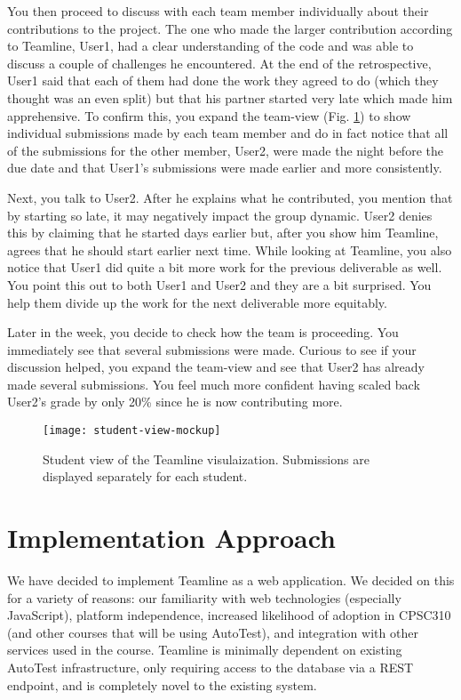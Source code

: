 \documentclass[preprint,journal]{vgtc}       %
\begin{document}
You then proceed to discuss with each team member individually about their contributions
to the project. The one who made the larger contribution according to Teamline, User1,
had a clear understanding of the code and was able to discuss a couple of challenges
he encountered. At the end of the retrospective, User1 said that each of them had
done the work they agreed to do (which they thought was an even split) but that
his partner started very late which made him apprehensive.
To confirm this, you expand the team-view (Fig. \ref{fig:studentview}) to show individual submissions made by
each team member and do in fact notice that all of the submissions for the other
member, User2, were made the night before the due date and that User1's submissions were
made earlier and more consistently.

Next, you talk to User2. After he explains what he contributed, you mention that by
starting so late, it may negatively impact the group dynamic. User2 denies this by claiming
that he started days earlier but, after you show him Teamline, agrees that he should
start earlier next time. While looking at Teamline, you also notice that User1 did
quite a bit more work for the previous deliverable as well. You point this out to
both User1 and User2 and they are a bit surprised. You help them divide up the work
for the next deliverable more equitably.

Later in the week, you decide to check how the team is proceeding. You immediately
see that several submissions were made. Curious to see if your discussion helped,
you expand the team-view and see that User2 has already made several submissions.
You feel much more confident having scaled back User2's grade by only 20\% since he
is now contributing more.

\begin{figure}[h]
  \centering
  \texttt{[image: student-view-mockup]}
  \caption{Student view of the Teamline visulaization. Submissions are displayed
   separately for each student.}
  \label{fig:studentview}
\end{figure}


\section{Implementation Approach}
We have decided to implement Teamline as a web application. We decided on this for
a variety of reasons: our familiarity with web technologies (especially JavaScript), platform independence,
increased likelihood of adoption in CPSC310 (and other courses that will be using AutoTest),
and integration with other services used in the course. Teamline is minimally dependent
on existing AutoTest infrastructure, only requiring access to the database via a
REST endpoint, and is completely novel to the existing system.
\end{document}
